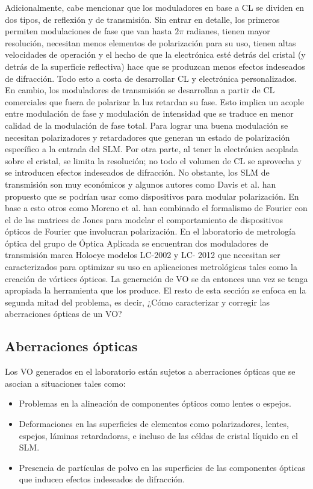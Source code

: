 Adicionalmente, cabe mencionar que los moduladores en base a CL se
dividen en dos tipos, de reflexión y de transmisión. Sin entrar en
detalle, los primeros permiten modulaciones de fase que van hasta $2\pi$
radianes, tienen mayor resolución, necesitan menos elementos de
polarización para su uso, tienen altas velocidades de operación y el
hecho de que la electrónica esté detrás del cristal (y detrás de la
superficie reflectiva) hace que se produzcan menos efectos indeseados
de difracción. Todo esto a costa de desarrollar CL y
electrónica personalizados. En cambio, los moduladores de transmisión
se desarrollan a partir de CL comerciales que fuera de polarizar la luz
retardan su fase. Esto implica un acople entre modulación de fase y 
modulación de intensidad que se traduce en menor calidad de la
modulación de fase total. Para lograr una buena
modulación se necesitan polarizadores y retardadores que generan un
estado de polarización específico a la entrada del SLM. Por otra
parte, al tener la electrónica acoplada sobre el cristal, se limita la
resolución; no todo el volumen de CL se aprovecha y se introducen
efectos indeseados de difracción. 
No obstante, los SLM de transmisión son muy económicos y algunos
autores como Davis et al. \cite{Davis2000, Davis2013} han propuesto
que se podrían usar como dispositivos para modular polarización. En
base a esto otros como Moreno et al. \cite{Moreno2004, Moreno2011} han
combinado el formalismo de Fourier con el de las matrices de Jones
para modelar el comportamiento de dispositivos ópticos de Fourier que
involucran polarización. 
En el laboratorio de metrología óptica del grupo de Óptica Aplicada se
encuentran dos moduladores de transmisión marca Holoeye modelos
LC-2002 y LC- 2012 que necesitan ser caracterizados para optimizar su
uso en aplicaciones metrológicas tales como la creación de vórtices
ópticos. 
La generación de VO se da entonces una vez se tenga apropiada la
herramienta que los produce. El resto de esta sección se enfoca en la
segunda mitad del problema, es decir, ¿Cómo caracterizar y corregir las
aberraciones ópticas de un VO?

\subsection{Aberraciones ópticas}

Los VO generados en el laboratorio están sujetos a aberraciones
ópticas que se asocian a situaciones tales como:
\begin{itemize}
\item Problemas en la alineación de componentes ópticos como
  lentes o espejos.
\item Deformaciones en las superficies de elementos como
  polarizadores, lentes, espejos, láminas retardadoras, e incluso de
  las céldas de cristal líquido en el SLM.
\item Presencia de partículas de polvo en las superficies de las
  componentes ópticas que inducen efectos indeseados de difracción. 
\end{itemize}

